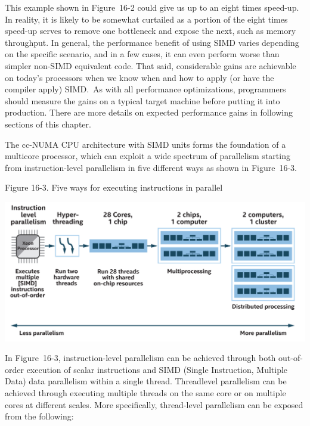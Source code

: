 This example shown in Figure 16-2 could give us up to an eight times speed-up. In reality, it is likely to be somewhat curtailed as a portion of the eight times speed-up serves to remove one bottleneck and expose the next, such as memory throughput. In general, the performance benefit of using SIMD varies depending on the specific scenario, and in a few cases, it can even perform worse than simpler non-SIMD equivalent code. That said, considerable gains are achievable on today’s processors when we know when and how to apply (or have the compiler apply) SIMD. As with all performance optimizations, programmers should measure the gains on a typical target machine before putting it into production. There are more details on expected performance gains in following sections of this chapter.\par

The cc-NUMA CPU architecture with SIMD units forms the foundation of a multicore processor, which can exploit a wide spectrum of parallelism starting from instruction-level parallelism in five different ways as shown in Figure 16-3.\par

\hspace*{\fill} \par %
Figure 16-3. Five ways for executing instructions in parallel
\begin{center}
	\includegraphics[width=1.0\textwidth]{content/chapter-16/images/4}
\end{center}

In Figure 16-3, instruction-level parallelism can be achieved through both out-of-order execution of scalar instructions and SIMD (Single Instruction, Multiple Data) data parallelism within a single thread. Threadlevel parallelism can be achieved through executing multiple threads on the same core or on multiple cores at different scales. More specifically, thread-level parallelism can be exposed from the following:\par

